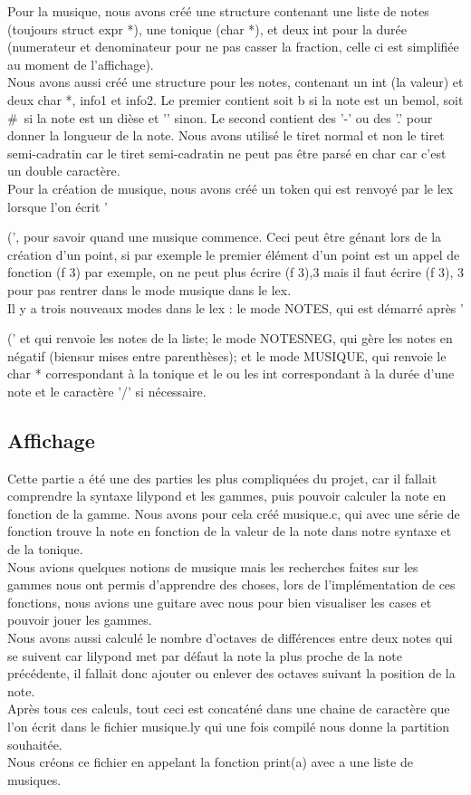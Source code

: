\documentclass{report}
\begin{document}
Pour la musique, nous avons créé une structure contenant une liste de notes (toujours struct expr *), une tonique (char *), et deux int pour la durée (numerateur et denominateur pour ne pas casser la fraction, celle ci est simplifiée au moment de l'affichage).\\
Nous avons aussi créé une structure pour les notes, contenant un int (la valeur) et deux char *, info1 et info2. Le premier contient soit b si la note est un bemol, soit # si la note est un dièse et '\0' sinon. Le second contient des '-' ou des '.' pour donner la longueur de la note. Nous avons utilisé le tiret normal et non le tiret semi-cadratin car le tiret semi-cadratin ne peut pas être parsé en char car c'est un double caractère.\\
Pour la création de musique, nous avons créé un token qui est renvoyé par le lex lorsque l'on écrit '{(', pour savoir quand une musique commence. Ceci peut être génant lors de la création d'un point, si par exemple le premier élément d'un point est un appel de fonction (f 3) par exemple, on ne peut plus écrire {(f 3),3} mais il faut écrire { (f 3), 3} pour pas rentrer dans le mode musique dans le lex.\\
Il y a trois nouveaux modes dans le lex : le mode NOTES, qui est démarré après '{(' et qui renvoie les notes de la liste; le mode NOTESNEG, qui gère les notes en négatif (biensur mises entre parenthèses); et le mode MUSIQUE, qui renvoie le char * correspondant à la tonique et le ou les int correspondant à la durée d'une note et le caractère '/' si nécessaire.

\subsection{Affichage}

Cette partie a été une des parties les plus compliquées du projet, car il fallait comprendre la syntaxe lilypond et les gammes, puis pouvoir calculer la note en fonction de la gamme. Nous avons pour cela créé musique.c, qui avec une série de fonction trouve la note en fonction de la valeur de la note dans notre syntaxe et de la tonique.\\
Nous avions quelques notions de musique mais les recherches faites sur les gammes nous ont permis d'apprendre des choses, lors de l'implémentation de ces fonctions, nous avions une guitare avec nous pour bien visualiser les cases et pouvoir jouer les gammes.\\
Nous avons aussi calculé le nombre d'octaves de différences entre deux notes qui se suivent car lilypond met par défaut la note la plus proche de la note précédente, il fallait donc ajouter ou enlever des octaves suivant la position de la note.\\
Après tous ces calculs, tout ceci est concaténé dans une chaine de caractère que l'on écrit dans le fichier musique.ly qui une fois compilé nous donne la partition souhaitée.\\
Nous créons ce fichier en appelant la fonction print(a) avec a une liste de musiques.

}}
\end{document}
